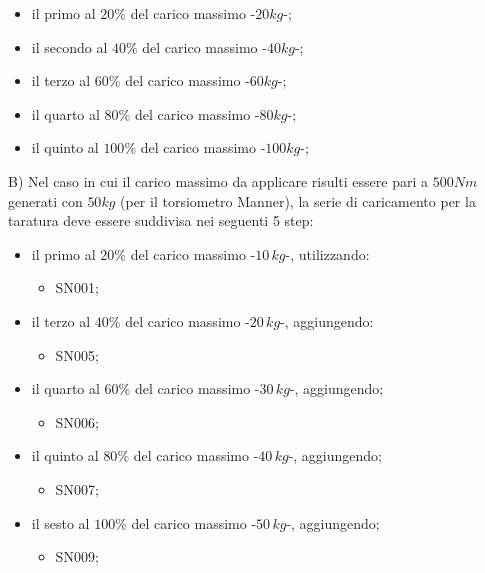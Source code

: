 \documentclass[a4paper, twoside]{article}
\begin{document}
\begin{itemize}
    \item il primo al $20 \% $ del carico massimo -$20kg$-;
    \item il secondo al $40 \% $ del carico massimo -$40kg$-;
    \item il terzo al $ 60 \% $ del carico massimo -$60kg$-;
    \item il quarto al $ 80 \% $ del carico massimo -$80kg$-;
    \item il quinto al $ 100\% $ del carico massimo -$100kg$-;
\end{itemize}

B)  Nel caso in cui il carico massimo da applicare risulti essere pari a $500Nm$ generati con $50kg$ (per il torsiometro Manner), la serie di caricamento per la taratura deve essere suddivisa nei seguenti 5 step:

\begin{itemize}
    \item il primo al $20 \% $ del carico massimo -$10\,kg$-, utilizzando:
        
        \begin{itemize}
            \item SN001;
        \end{itemize}

    \item il terzo al $40 \% $ del carico massimo -$20\,kg$-, aggiungendo:
       
        \begin{itemize}
            \item SN005;
        \end{itemize}

    \item il quarto al $60 \% $ del carico massimo -$30\,kg$-, aggiungendo;
        
        \begin{itemize}
            \item SN006;
        \end{itemize}

    \item il quinto al $80 \% $ del carico massimo -$40\,kg$-, aggiungendo;
    
        \begin{itemize}
            \item SN007;
        \end{itemize}

    \item il sesto al $100 \% $ del carico massimo -$50\,kg$-, aggiungendo;
    
        \begin{itemize}
            \item SN009;
        \end{itemize}
\end{itemize}
\end{document}
